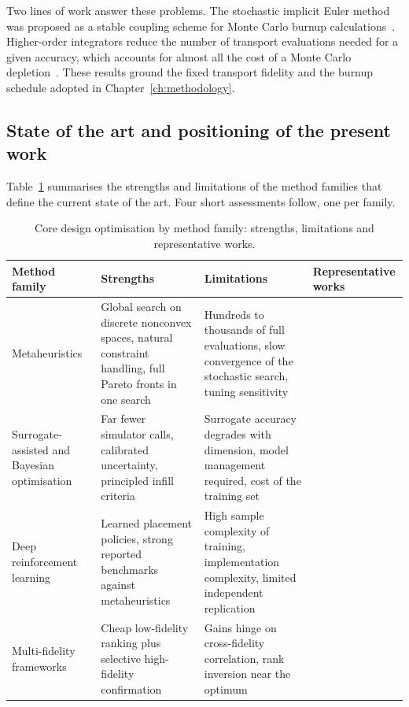 Two lines of work answer these problems. The stochastic implicit Euler
method was proposed as a stable coupling scheme for Monte Carlo burnup
calculations~\cite{dufek_2013_sie}. Higher-order integrators reduce the
number of transport evaluations needed for a given accuracy, which
accounts for almost all the cost of a Monte Carlo depletion~\cite{josey_2017}.
These results ground the fixed transport fidelity and the burnup
schedule adopted in Chapter~\ref{ch:methodology}.

\subsection{State of the art and positioning of the present work}
\label{sec:lit-opt-sota}

Table~\ref{tab:lit-opt-sota} summarises the strengths and limitations
of the method families that define the current state of the art. Four
short assessments follow, one per family.

\begin{table}[htbp]
  \centering
  \caption{Core design optimisation by method family: strengths, limitations and representative works.}
  \label{tab:lit-opt-sota}
  \footnotesize
  \begin{tabular}{@{}>{\raggedright\arraybackslash}p{}>{\raggedright\arraybackslash}p{}%
                  >{\raggedright\arraybackslash}p{}>{\raggedright\arraybackslash}p{}@{}}
    \toprule
    Method family & Strengths & Limitations & Representative works \\
    \midrule
    Metaheuristics &
    Global search on discrete nonconvex spaces, natural constraint
    handling, full Pareto fronts in one search &
    Hundreds to thousands of full evaluations, slow convergence of the
    stochastic search, tuning sensitivity &
    \cite{kropaczek_turinsky_1991,parks_1996,deb_nsga2_2002} \\
    \addlinespace
    Surrogate-assisted and Bayesian optimisation &
    Far fewer simulator calls, calibrated uncertainty, principled
    infill criteria &
    Surrogate accuracy degrades with dimension, model management
    required, cost of the training set &
    \cite{jin_2011,rasmussen_gp_2006,whyte_2020} \\
    \addlinespace
    Deep reinforcement learning &
    Learned placement policies, strong reported benchmarks against
    metaheuristics &
    High sample complexity of training, implementation complexity, limited
    independent replication &
    \cite{radaideh_2021_rl,seurin_2024_pearl} \\
    \addlinespace
    Multi-fidelity frameworks &
    Cheap low-fidelity ranking plus selective high-fidelity confirmation &
    Gains hinge on cross-fidelity correlation, rank inversion near the
    optimum &
    \cite{kennedy_ohagan_2000} \\
    \bottomrule
  \end{tabular}
\end{table}

